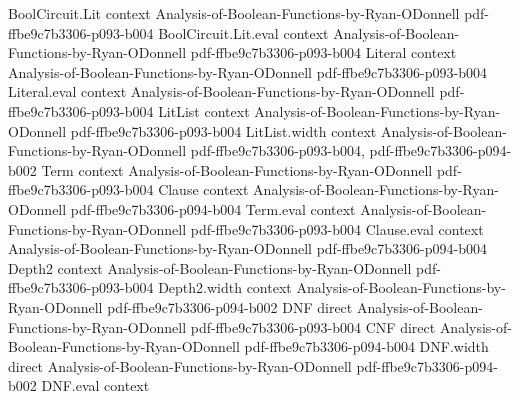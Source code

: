 \begin{lemma}
\label{BoolFourier.fourier_coeff_convolution}
\leanok
{}
\proofstep
  {BoolCircuit.Lit}
  {context}
  {Analysis-of-Boolean-Functions-by-Ryan-ODonnell}
  {pdf-ffbe9c7b3306-p093-b004}
\proofstep
  {BoolCircuit.Lit.eval}
  {context}
  {Analysis-of-Boolean-Functions-by-Ryan-ODonnell}
  {pdf-ffbe9c7b3306-p093-b004}
\proofstep
  {Literal}
  {context}
  {Analysis-of-Boolean-Functions-by-Ryan-ODonnell}
  {pdf-ffbe9c7b3306-p093-b004}
\proofstep
  {Literal.eval}
  {context}
  {Analysis-of-Boolean-Functions-by-Ryan-ODonnell}
  {pdf-ffbe9c7b3306-p093-b004}
\proofstep
  {LitList}
  {context}
  {Analysis-of-Boolean-Functions-by-Ryan-ODonnell}
  {pdf-ffbe9c7b3306-p093-b004}
\proofstep
  {LitList.width}
  {context}
  {Analysis-of-Boolean-Functions-by-Ryan-ODonnell}
  {pdf-ffbe9c7b3306-p093-b004,
    pdf-ffbe9c7b3306-p094-b002}
\proofstep
  {Term}
  {context}
  {Analysis-of-Boolean-Functions-by-Ryan-ODonnell}
  {pdf-ffbe9c7b3306-p093-b004}
\proofstep
  {Clause}
  {context}
  {Analysis-of-Boolean-Functions-by-Ryan-ODonnell}
  {pdf-ffbe9c7b3306-p094-b004}
\proofstep
  {Term.eval}
  {context}
  {Analysis-of-Boolean-Functions-by-Ryan-ODonnell}
  {pdf-ffbe9c7b3306-p093-b004}
\proofstep
  {Clause.eval}
  {context}
  {Analysis-of-Boolean-Functions-by-Ryan-ODonnell}
  {pdf-ffbe9c7b3306-p094-b004}
\proofstep
  {Depth2}
  {context}
  {Analysis-of-Boolean-Functions-by-Ryan-ODonnell}
  {pdf-ffbe9c7b3306-p093-b004}
\proofstep
  {Depth2.width}
  {context}
  {Analysis-of-Boolean-Functions-by-Ryan-ODonnell}
  {pdf-ffbe9c7b3306-p094-b002}
\proofstep
  {DNF}
  {direct}
  {Analysis-of-Boolean-Functions-by-Ryan-ODonnell}
  {pdf-ffbe9c7b3306-p093-b004}
\proofstep
  {CNF}
  {direct}
  {Analysis-of-Boolean-Functions-by-Ryan-ODonnell}
  {pdf-ffbe9c7b3306-p094-b004}
\proofstep
  {DNF.width}
  {direct}
  {Analysis-of-Boolean-Functions-by-Ryan-ODonnell}
  {pdf-ffbe9c7b3306-p094-b002}
\proofstep
  {DNF.eval}
  {context}

\end{lemma}
